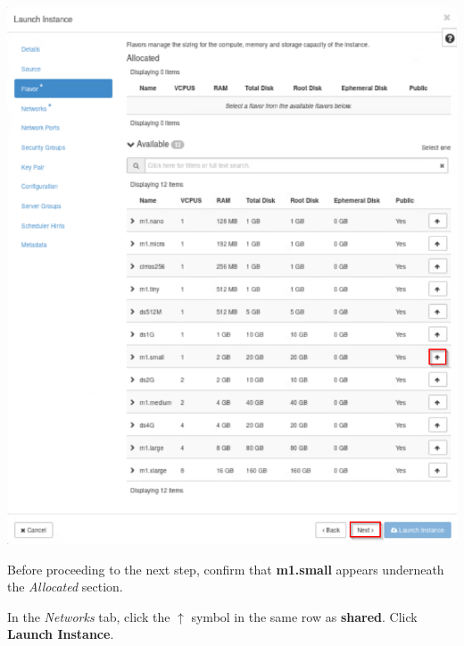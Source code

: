 \documentclass[letterpaper, 12pt]{article}
\begin{document}
\begin{enumerate}
\begin{labstep}
        \begin{center}
            \includegraphics[width=\linewidth]{images/part1/step7.png}
        \end{center}
    \end{labstep}

    \begin{stopbox}
        Before proceeding to the next step, confirm that \textbf{m1.small} appears underneath the \textit{Allocated} section.
    \end{stopbox}

    \begin{labstep}
        In the \textit{Networks} tab, click the $\uparrow$ symbol in the same row as \textbf{shared}.
        Click \textbf{Launch Instance}.


\end{labstep}
\end{enumerate}
\end{document}
